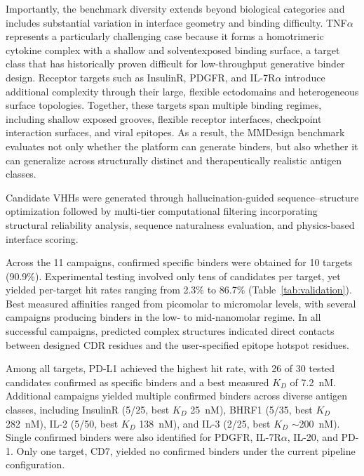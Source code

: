 \documentclass[11pt]{article}
\begin{document}
Importantly, the benchmark diversity extends beyond biological categories and includes substantial variation in interface geometry and binding difficulty. TNF$\alpha$ represents a particularly
challenging case because it forms a homotrimeric cytokine complex with a shallow and solventexposed binding surface, a target class that has historically proven difficult for low-throughput
generative binder design. Receptor targets such as InsulinR, PDGFR, and IL-7R$\alpha$ introduce additional complexity through their large, flexible ectodomains and heterogeneous surface topologies.
Together, these targets span multiple binding regimes, including shallow exposed grooves, flexible
receptor interfaces, checkpoint interaction surfaces, and viral epitopes. As a result, the MMDesign
benchmark evaluates not only whether the platform can generate binders, but also whether it can
generalize across structurally distinct and therapeutically realistic antigen classes.

Candidate VHHs were generated through hallucination-guided sequence--structure optimization followed by multi-tier computational filtering incorporating structural reliability analysis,
sequence naturalness evaluation, and physics-based interface scoring.

Across the 11 campaigns, confirmed specific binders were obtained for 10 targets (90.9\%).
Experimental testing involved only tens of candidates per target, yet yielded per-target hit rates
ranging from 2.3\% to 86.7\% (Table~\ref{tab:validation}). Best measured affinities ranged from picomolar to micromolar
levels, with several campaigns producing binders in the low- to mid-nanomolar regime. In all
successful campaigns, predicted complex structures indicated direct contacts between designed
CDR residues and the user-specified epitope hotspot residues.

Among all targets, PD-L1 achieved the highest hit rate, with 26 of 30 tested candidates confirmed
as specific binders and a best measured $K_D$ of 7.2~nM. Additional campaigns yielded multiple
confirmed binders across diverse antigen classes, including InsulinR (5/25, best $K_D$ 25~nM), BHRF1
(5/35, best $K_D$ 282~nM), IL-2 (5/50, best $K_D$ 138~nM), and IL-3 (2/25, best $K_D$ $\sim$200~nM). Single
confirmed binders were also identified for PDGFR, IL-7R$\alpha$, IL-20, and PD-1. Only one target, CD7,
yielded no confirmed binders under the current pipeline configuration.
\end{document}
